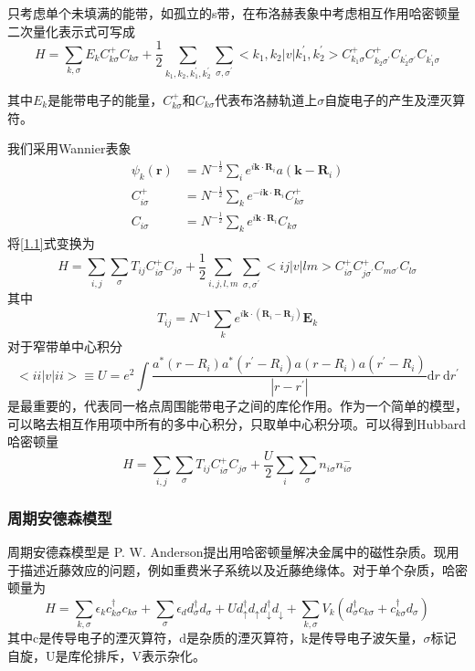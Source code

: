 只考虑单个未填满的能带，如孤立的s带，在布洛赫表象中考虑相互作用哈密顿量二次量化表示式可写成
\begin{equation}
    H=\sum_{k, \sigma} E_{k} C_{k \sigma}^{+} C_{k \sigma}+\frac{1}{2} \sum_{k_{1}, k_{2}, k_{1}^{\prime}, k_{2}^{\prime}} \sum_{\sigma, \sigma^{\prime}}<k_{1}, k_{2}|v| k_{1}^{\prime}, k_{2}^{\prime}>C_{k_{1} \sigma}^{+} C_{k_{2} \sigma^{\prime}}^{+} C_{k^{\prime}_2 \sigma^{\prime}} C_{k^{\prime}_1 \sigma}
    \label{1.1}
\end{equation}

其中$E_k$是能带电子的能量，$C^+_{k \sigma}$和$C_{k \sigma}$代表布洛赫轨道上$\sigma$自旋电子的产生及湮灭算符。

我们采用Wannier表象
\begin{align*}
    \psi_k(\textbf{r})&=N^{-\frac{1}{2}}\sum_i e^{i\textbf{k}\cdot \textbf{R}_i} a(\textbf{k} - \textbf{R}_i)\\
    C^+_{i \sigma}&=N^{-\frac{1}{2}} \sum_k e^{- i\textbf{k}\cdot \textbf{R}_i} C^+_{k \sigma}\\
    C_{i \sigma}&=N^{-\frac{1}{2}} \sum_k e^{i\textbf{k}\cdot \textbf{R}_i} C_{k \sigma}
\end{align*}
将\ref{1.1}式变换为
$$
H=\sum_{i, j} \sum_{\sigma} T_{i j} C_{i \sigma}^{+} C_{j \sigma}+\frac{1}{2} \sum_{i, j, l, m} \sum_{\sigma, \sigma^{\prime}}<i j|v| l m>C_{i \sigma}^{+} C_{j \sigma^{\prime}}^{+} C_{m \sigma^{\prime}} C_{l \sigma}
$$
其中
$$T_{ij}=N^{-1}\sum_k e^{i \textbf{k} \cdot (\textbf{R}_i-\textbf{R}_j)}\textbf{E}_k$$
对于窄带单中心积分
$$
<i i|v| i i>\equiv U=e^{2} \int \frac{a^{*}\left(r-R_{i}\right) a^{*}\left(r^{\prime}-R_{i}\right) a\left(r-R_{i}\right) a\left(r^{\prime}-R_{i}\right)}{\left|r-r^{\prime}\right|} \mathrm{d} r \mathrm{~d} r^{\prime}
$$
是最重要的，代表同一格点周围能带电子之间的库伦作用。作为一个简单的模型，可以略去相互作用项中所有的多中心积分，只取单中心积分项。可以得到Hubbard哈密顿量
$$
H=\sum_{i, j} \sum_{\sigma} T_{i j} C_{i \sigma}^{+} C_{j \sigma}+\frac{U}{2} \sum_{i} \sum_{\sigma} n_{i \sigma} n_{i \sigma}^{-}
$$

\subsubsection{周期安德森模型}
周期安德森模型是 P. W. Anderson提出用哈密顿量解决金属中的磁性杂质\cite{2}。现用于描述近藤效应的问题，例如重费米子系统以及近藤绝缘体。对于单个杂质，哈密顿量为
$$
H=\sum_{k, \sigma} \epsilon_{k} c_{k \sigma}^{\dagger} c_{k \sigma}+\sum_{\sigma} \epsilon_{d} d_{\sigma}^{\dagger} d_{\sigma}+U d_{\uparrow}^{\dagger} d_{\uparrow} d_{\downarrow}^{\dagger} d_{\downarrow}+\sum_{k, \sigma} V_{k}\left(d_{\sigma}^{\dagger} c_{k \sigma}+c_{k \sigma}^{\dagger} d_{\sigma}\right)
$$
其中c是传导电子的湮灭算符，d是杂质的湮灭算符，k是传导电子波矢量，$\sigma$标记自旋，U是库伦排斥，V表示杂化。

